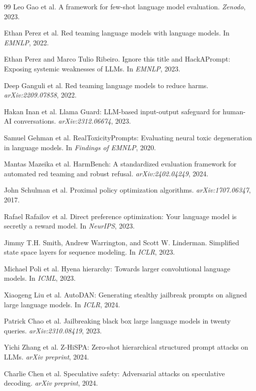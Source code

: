 \documentclass{article}
\begin{document}
\begin{thebibliography}{99}
Leo Gao et al.
A framework for few-shot language model evaluation.
\emph{Zenodo}, 2023.

Ethan Perez et al.
Red teaming language models with language models.
In \emph{EMNLP}, 2022.

Ethan Perez and Marco Tulio Ribeiro.
Ignore this title and HackAPrompt: Exposing systemic weaknesses of LLMs.
In \emph{EMNLP}, 2023.

Deep Ganguli et al.
Red teaming language models to reduce harms.
\emph{arXiv:2209.07858}, 2022.

Hakan Inan et al.
Llama Guard: LLM-based input-output safeguard for human-AI conversations.
\emph{arXiv:2312.06674}, 2023.

Samuel Gehman et al.
RealToxicityPrompts: Evaluating neural toxic degeneration in language models.
In \emph{Findings of EMNLP}, 2020.

Mantas Mazeika et al.
HarmBench: A standardized evaluation framework for automated red teaming and robust refusal.
\emph{arXiv:2402.04249}, 2024.

John Schulman et al.
Proximal policy optimization algorithms.
\emph{arXiv:1707.06347}, 2017.

Rafael Rafailov et al.
Direct preference optimization: Your language model is secretly a reward model.
In \emph{NeurIPS}, 2023.

Jimmy T.H. Smith, Andrew Warrington, and Scott W. Linderman.
Simplified state space layers for sequence modeling.
In \emph{ICLR}, 2023.

Michael Poli et al.
Hyena hierarchy: Towards larger convolutional language models.
In \emph{ICML}, 2023.

Xiaogeng Liu et al.
AutoDAN: Generating stealthy jailbreak prompts on aligned large language models.
In \emph{ICLR}, 2024.

Patrick Chao et al.
Jailbreaking black box large language models in twenty queries.
\emph{arXiv:2310.08419}, 2023.

Yichi Zhang et al.
Z-HiSPA: Zero-shot hierarchical structured prompt attacks on LLMs.
\emph{arXiv preprint}, 2024.

Charlie Chen et al.
Speculative safety: Adversarial attacks on speculative decoding.
\emph{arXiv preprint}, 2024.


\end{thebibliography}
\end{document}
